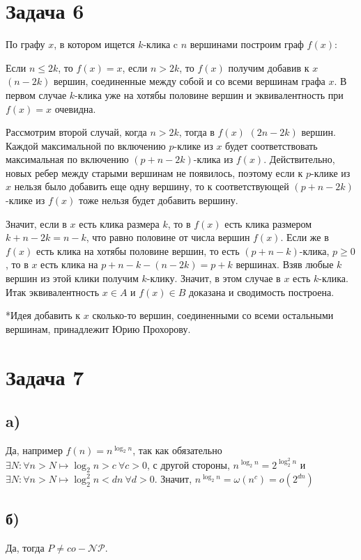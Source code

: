 \documentclass[a4paper,12pt]{article} %
\begin{document}
\section{Задача 6}
\hspace{5mm}
По графу $x$, в котором ищется $k$-клика c $n$ вершинами построим граф $f(x)$:

Если $n\leq 2k$, то $f(x)=x$, если $n>2k$, то $f(x)$ получим добавив к $x$ $(n-2k)$ вершин, соединенные между собой и со всеми вершинам графа $x$. В первом случае $k$-клика уже на хотябы половине вершин и эквивалентность при $f(x)=x$ очевидна.

Рассмотрим второй случай, когда $n>2k$, тогда в $f(x)$ $(2n-2k)$ вершин. Каждой максимальной по включению $p$-клике из $x$ будет соответствовать максимальная по включению $(p+n-2k)$-клика из $f(x)$. Действительно, новых ребер между старыми вершинам не появилось, поэтому если к $p$-клике из $x$ нельзя было добавить еще одну вершину, то к соответствующей $(p+n-2k)$-клике из $f(x)$ тоже нельзя будет добавить вершину. 

Значит, если в $x$ есть клика размера $k$, то в $f(x)$ есть клика размером $k+n-2k=n-k$, что равно половине от числа вершин $f(x)$. Если же в $f(x)$ есть клика на хотябы половине вершин, то есть $(p+n-k)$-клика, $p\geq 0$, то в $x$ есть клика на $p+n-k-(n-2k)=p+k$ вершинах. Взяв любые $k$ вершин из этой клики получим $k$-клику. Значит, в этом случае в $x$ есть $k$-клика. Итак эквивалентность $x\in A$ и $f(x)\in B$ доказана и сводимость построена.

*Идея добавить к $x$ сколько-то вершин, соединенными со всеми остальными вершинам, принадлежит Юрию Прохорову.



\section{Задача 7}
\subsection{a)}
\hspace{5mm}
Да, например $f(n)=n^{\log_2 n}$, так как обязательно $\exists N:\forall n>N\mapsto \log_2 n > c\ \forall c>0$, с другой стороны, $n^{\log_2 n}=2^{\log_2^2 n}$ и $\exists N:\forall n>N\mapsto \log_2^2 n < dn\ \forall d>0$. Значит, $n^{\log_2 n}=\omega(n^c)=o(2^{dn})$

\subsection{б)}
\hspace{5mm}
Да, тогда $P\neq co-\mathcal{NP}$. 
\end{document}
